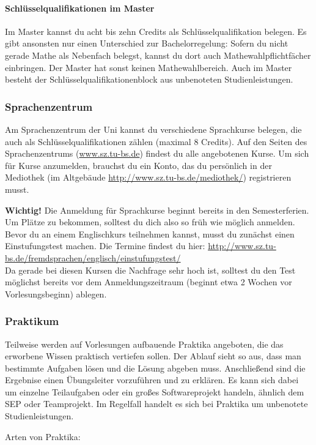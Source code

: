 \begin{multicols}{2}
	\paragraph*{Schlüsselqualifikationen im Master}
	Im Master kannst du acht bis zehn Credits als Schlüsselqualifikation belegen. Es gibt ansonsten nur einen Unterschied zur Bachelorregelung: Sofern du nicht gerade Mathe als Nebenfach belegst, kannst du dort auch Mathewahlpflichtfächer einbringen. Der Master hat sonst keinen Mathewahlbereich. Auch im Master besteht der Schlüsselqualifikationenblock aus unbenoteten Studienleistungen.

	\subsubsection*{Sprachenzentrum}
	Am Sprachenzentrum der Uni kannst du verschiedene Sprachkurse belegen, die auch als Schlüsselqualifikationen zählen (maximal 8 Credits). Auf den Seiten des Sprachenzentrums (\url{www.sz.tu-bs.de}) findest du alle angebotenen Kurse. Um sich für Kurse anzumelden, brauchst du ein Konto, das du persönlich in der Mediothek (im Altgebäude \url{http://www.sz.tu-bs.de/mediothek/}) registrieren musst.

	\textbf{Wichtig!} Die Anmeldung für Sprachkurse beginnt bereits in den Semesterferien. Um Plätze zu bekommen, solltest du dich also so früh wie möglich anmelden. Bevor du an einem Englischkurs teilnehmen kannst, musst du zunächst einen Einstufungstest machen. Die Termine findest du hier: \url{http://www.sz.tu-bs.de/fremdsprachen/englisch/einstufungstest/}\\ 
	Da gerade bei diesen Kursen die Nachfrage sehr hoch ist, solltest du den Test möglichst bereits vor dem Anmeldungszeitraum (beginnt etwa 2 Wochen vor Vorlesungsbeginn) ablegen.

	\subsubsection*{Praktikum}
	Teilweise werden auf Vorlesungen aufbauende Praktika angeboten, die das erworbene Wissen praktisch vertiefen sollen. Der Ablauf sieht so aus, dass man bestimmte Aufgaben lösen und die Lösung abgeben muss. Anschließend sind die Ergebnise einen Übungsleiter vorzuführen und zu erklären. Es kann sich dabei um einzelne Teilaufgaben oder ein großes Softwareprojekt handeln, ähnlich dem SEP oder Teamprojekt. Im Regelfall handelt es sich bei Praktika um unbenotete Studienleistungen.

	Arten von Praktika:
	

\end{multicols}

